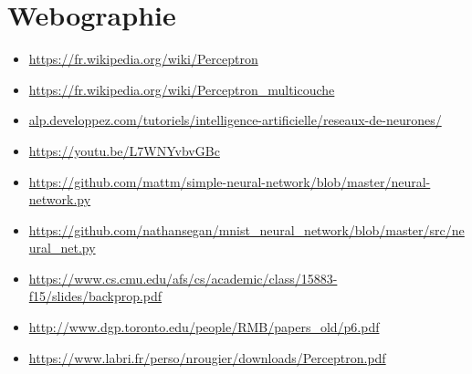 \section{Webographie} 
\begin{itemize}
\item \url{https://fr.wikipedia.org/wiki/Perceptron} \newline
\item \url{https://fr.wikipedia.org/wiki/Perceptron_multicouche} \newline
\item \url{alp.developpez.com/tutoriels/intelligence-artificielle/reseaux-de-neurones/} \newline
\item \url{https://youtu.be/L7WNYvbvGBc} \newline
\item \url{https://github.com/mattm/simple-neural-network/blob/master/neural-network.py} \newline
\item \url{https://github.com/nathansegan/mnist_neural_network/blob/master/src/neural_net.py} \newline
\item \url{https://www.cs.cmu.edu/afs/cs/academic/class/15883-f15/slides/backprop.pdf} \newline
\item \url{http://www.dgp.toronto.edu/people/RMB/papers_old/p6.pdf} \newline
\item \url{https://www.labri.fr/perso/nrougier/downloads/Perceptron.pdf} \newline

\end{itemize}


